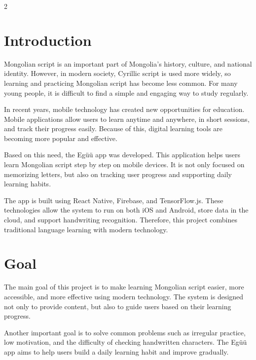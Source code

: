 \begin{multicols}{2}

\section*{Introduction}
Mongolian script is an important part of Mongolia’s history, culture, and national identity. However, in modern society, Cyrillic script is used more widely, so learning and practicing Mongolian script has become less common. For many young people, it is difficult to find a simple and engaging way to study regularly.

In recent years, mobile technology has created new opportunities for education. Mobile applications allow users to learn anytime and anywhere, in short sessions, and track their progress easily. Because of this, digital learning tools are becoming more popular and effective.

Based on this need, the Egüü app was developed. This application helps users learn Mongolian script step by step on mobile devices. It is not only focused on memorizing letters, but also on tracking user progress and supporting daily learning habits.

The app is built using React Native, Firebase, and TensorFlow.js. These technologies allow the system to run on both iOS and Android, store data in the cloud, and support handwriting recognition. Therefore, this project combines traditional language learning with modern technology.

\section*{Goal}
The main goal of this project is to make learning Mongolian script easier, more accessible, and more effective using modern technology. The system is designed not only to provide content, but also to guide users based on their learning progress.

Another important goal is to solve common problems such as irregular practice, low motivation, and the difficulty of checking handwritten characters. The Egüü app aims to help users build a daily learning habit and improve gradually.


\end{multicols}
